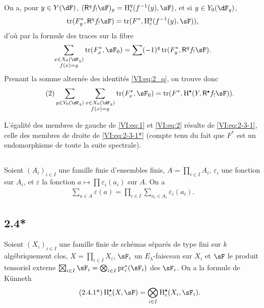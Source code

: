 On a, pour $y\in Y(\dF)$, $(\R^q f_! \sF)_y = \h_c^q(f^{-1}(y),\sF)$, et si 
$y\in Y_0(\dF_q)$, 
\[
  \tr(F_y^\ast,\R^q f_! \sF) = \tr(F^\ast,\h_c^q(f^{-1}(y),\sF)) \text{,}
\]
d'o\`u par la formule des traces sur la fibre 
\[
  \sum_{\substack{x\in X_0(\dF_q) \\ f(x) = y}} \tr(F_x^\ast,\sF_0) = \sum (-1)^q \tr(F_y^\ast,\R^q f_! \sF) \text{.}
\]
Prenant la somme altern\'ee des identit\'es \eqref{VI:eq:2_q}, on trouve donc 
\begin{align*}\tag{2}\label{VI:eq:2}
  \sum_{y\in Y_0(\dF_q)} \sum_{\substack{x \in X_0(\dF_q) \\ f(x) = y}} \tr(F_x^\ast,\sF_0) = \tr(F^\ast,\h^\bullet(Y,\R^\bullet f_! \sF)) \text{.}
\end{align*}

L'\'egalit\'e des membres de gauche de \eqref{VI:eq:1} et \eqref{VI:eq:2} 
r\'esulte de \eqref{VI:eq:2-3-1}, celle des membres de droite de 
\eqref{VI:eq:2-3-1*} (compte tenu du fait que $F^\ast$ est un endomorphisme de 
toute la suite spectrale). 





\subsection{}\label{VI:2-4}

Soient $(A_i)_{i\in I}$ une famille finie d'ensembles finis, 
$A=\prod_{i\in I} A_i$, $\varepsilon_i$ une fonction sur $A_i$, et 
$\varepsilon$ la fonction $a\mapsto \prod \varepsilon_i(a_i)$ sur $A$. On a 
\begin{align*}\tag{2.4.1}\label{VI:eq:2-4-1}
  \sum_{a\in A} \varepsilon(a) = \prod_{i\in I} \sum_{a_i\in A_i} \varepsilon_i(a_i) \text{.}
\end{align*}





\subsection*{2.4*}\label{VI:2-4*}

Soient $(X_i)_{i\in I}$ une famille finie de sch\'emas s\'epar\'es de type fini 
sur $k$ alg\'ebriquement clos, $X=\prod_{i\in I} X_i$, $\sF_i$ un 
$E_\lambda$-faisceau sur $X_i$ et $\sF$ le produit tensoriel externe 
$\bigboxtimes_{i\in I}\sF_i = \bigotimes_{i\in I} \pr_i^\ast(\sF_i)$ 
des $\sF_i$. On a la formule de K\"unneth 
\begin{align*}\tag{2.4.1*}\label{VI:eq:2-4-1*}
  \h_c^\bullet(X,\sF) = \bigotimes_{i\in I} \h_c^\bullet(X_i,\sF_i) \text{.}
\end{align*}

